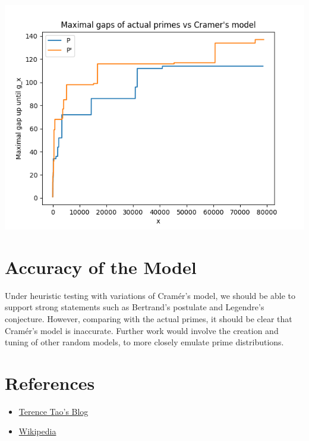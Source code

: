 \documentclass[12pt, letterpaper]{article}
\begin{document}
\includegraphics[scale=0.7]{graph.png}

\section{Accuracy of the Model}

Under heuristic testing with variations of Cram\'er's model, we should be able to support strong statements such as Bertrand's postulate and Legendre's conjecture. However, comparing with the actual primes, it should be clear that Cram\'er's model is inaccurate. Further work would involve the creation and tuning of other random models, to more closely emulate prime distributions.

\section{References}

\begin{itemize}
    \item \href{http://terrytao.wordpress.com/2015/01/04/254a-supplement-4-probabilistic-models-and-heuristics-for-the-primes-optional/#more-7956}{Terence Tao's Blog}
    \item \href{https://en.wikipedia.org/wiki/Prime_gap}{Wikipedia}
\end{itemize}

 
\end{document}
